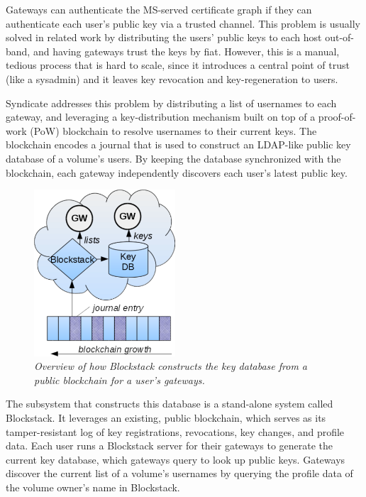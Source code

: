 Gateways can authenticate the MS-served certificate graph if they can
authenticate each user's public key via a trusted channel. This problem is
usually solved in related work by distributing the users' public keys to
each host out-of-band, and having gateways trust the keys by fiat. However, this
is a manual, tedious process that is hard to scale, since it introduces a
central point of trust (like a sysadmin) and it leaves key revocation and
key-regeneration to users.


Syndicate addresses this problem by distributing a list of usernames to each
gateway, and leveraging a key-distribution mechanism built on top of a
proof-of-work (PoW) blockchain to resolve usernames to their current keys. The
blockchain encodes a journal that is used to construct an LDAP-like public key
database of a volume's users. By keeping the database synchronized with the
blockchain, each gateway independently discovers each user's latest public
key.


\begin{figure}[t!]
\centering
\includegraphics[width=0.47\textwidth]{figures/blockstack-overview}
\caption{\it
Overview of how Blockstack constructs the key database from a public blockchain
for a user's gateways.
   }
\label{fig:cert-graph}
\end{figure}

The subsystem that constructs this database is a stand-alone system called
Blockstack. It leverages an existing, public blockchain, which serves as its
tamper-resistant log of key registrations, revocations, key changes, and profile
data. Each user runs a Blockstack server for their gateways to generate the
current key database, which gateways query to look up public keys. Gateways
discover the current list of a volume's usernames by querying the profile
data of the volume owner's name in Blockstack.


